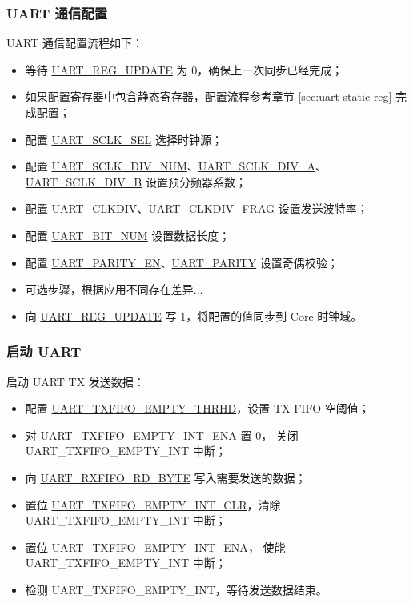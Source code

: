 \documentclass[main\_\_CN.tex]{subfiles}
\begin{document}
\subsubsection{UART 通信配置}

UART 通信配置流程如下：
\begin{itemize}
    \item 等待 \hyperref[fielddesc:UARTREGUPDATE]{UART\_REG\_UPDATE} 为 0，确保上一次同步已经完成；
    \item 如果配置寄存器中包含静态寄存器，配置流程参考章节 \ref{sec:uart-static-reg} 完成配置；
    \item 配置 \hyperref[fielddesc:UARTSCLKSEL]{UART\_SCLK\_SEL} 选择时钟源；
    \item 配置 \hyperref[fielddesc:UARTSCLKDIVNUM]{UART\_SCLK\_DIV\_NUM}、\hyperref[fielddesc:UARTSCLKDIVA]{UART\_SCLK\_DIV\_A}、\hyperref[fielddesc:UARTSCLKDIVB]{UART\_SCLK\_DIV\_B} 设置预分频器系数；
    \item 配置 \hyperref[fielddesc:UARTCLKDIV]{UART\_CLKDIV}、\hyperref[fielddesc:UARTCLKDIVFRAG]{UART\_CLKDIV\_FRAG} 设置发送波特率；
    \item 配置 \hyperref[fielddesc:UARTBITNUM]{UART\_BIT\_NUM} 设置数据长度；
    \item 配置 \hyperref[fielddesc:UARTPARITYEN]{UART\_PARITY\_EN}、\hyperref[fielddesc:UARTPARITY]{UART\_PARITY} 设置奇偶校验；
    \item 可选步骤，根据应用不同存在差异...
    \item 向 \hyperref[fielddesc:UARTREGUPDATE]{UART\_REG\_UPDATE} 写 1，将配置的值同步到 Core 时钟域。
\end{itemize}

\subsubsection{启动 UART}
启动 UART TX 发送数据：
\begin{itemize}
    \item 配置 \hyperref[fielddesc:UARTTXFIFOEMPTYTHRHD]{UART\_TXFIFO\_EMPTY\_THRHD}，设置 TX FIFO 空阈值；
    \item 对 \hyperref[fielddesc:UARTTXFIFOEMPTYINTENA]{UART\_TXFIFO\_EMPTY\_INT\_ENA} 置 0， 关闭 UART\_TXFIFO\_EMPTY\_INT 中断；
    \item 向 \hyperref[fielddesc:UARTRXFIFORDBYTE]{UART\_RXFIFO\_RD\_BYTE} 写入需要发送的数据；
    \item 置位 \hyperref[fielddesc:UARTTXFIFOEMPTYINTCLR]{UART\_TXFIFO\_EMPTY\_INT\_CLR}，清除 UART\_TXFIFO\_EMPTY\_INT 中断；
    \item 置位 \hyperref[fielddesc:UARTTXFIFOEMPTYINTENA]{UART\_TXFIFO\_EMPTY\_INT\_ENA}， 使能 UART\_TXFIFO\_EMPTY\_INT 中断；
    \item 检测 UART\_TXFIFO\_EMPTY\_INT，等待发送数据结束。
\end{itemize}
\end{document}
